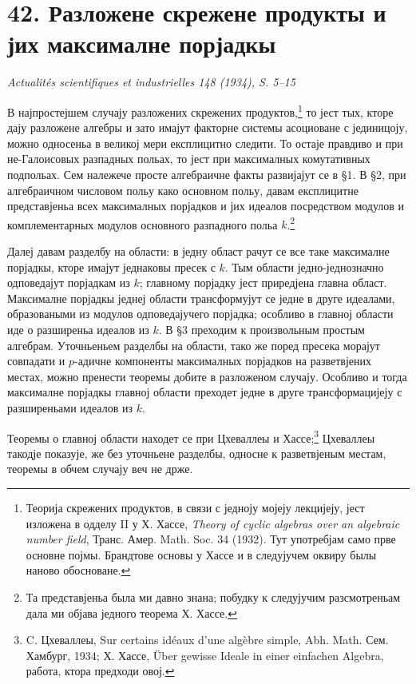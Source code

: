 ﻿\documentclass[11pt]{article}
\newcommand{\foreign}[1]{#1}
\begin{document}
\section*{42. Разложене скрежене продукты и јих максималне порјадкы}

\begin{center}
\emph{\foreign{Actualités scientifiques et industrielles 148 (1934), S. 5--15}}
\end{center}

В најпростејшем случају разложених скрежених продуктов,\footnote{Теорија скрежених продуктов, в связи с једноју мојеју лекцијеју, јест изложена в одделу II у Х. Хассе, \foreign{\emph{Theory of cyclic algebras over an algebraic number field}}, Транс. Амер. Math. Soc. 34 (1932). Тут употребјам само прве основне појмы. Брандтове основы у Хассе и в следујучем оквиру былы наново обосноване.} то јест тых, кторе дају разложене алгебры и зато имајут факторне системы асоциоване с јединицоју, можно односеньа в великој мери експлицитно следити. То остаје правдиво и при не-Галоисовых разпадных польах, то јест при максималных комутативных подпольах. Сем належече просте алгебраичне факты развијајут се в §1. В §2, при алгебраичном числовом польу како основном польу, давам експлицитне представјеньа всех максималных порјадков и јих идеалов посредством модулов и комплементарных модулов основного разпадного польа \(k\).\footnote{Та представјеньа была ми давно знана; побудку к следујучим разсмотреньам дала ми објава једного теорема Х. Хассе.}

Далеј давам разделбу на области: в једну област рачут се все таке максималне порјадкы, кторе имајут једнаковы пресек с \(k\). Тым области једно-једнозначно одповедајут порјадкам из \(k\); главному порјадку јест приредјена главна област. Максималне порјадкы једнеј области трансформујут се једне в друге идеалами, образоваными из модулов одповедајучего порјадка; особливо в главној области иде о разширеньа идеалов из \(k\). В §3 преходим к произвольным простым алгебрам. Уточньеньем разделбы на области, тако же поред пресека морајут совпадати и \(p\)-адичне компоненты максималных порјадков на разветвјених местах, можно пренести теоремы добите в разложеном случају. Особливо и тогда максималне порјадкы главној области преходет једне в друге трансформацијеју с разширеньами идеалов из \(k\).

Теоремы о главној области находет се при Цхеваллеы и Хассе;\footnote{C. Цхеваллеы, \foreign{Sur certains idéaux d'une algèbre simple}, Abh. Math. Сем. Хамбург, 1934; Х. Хассе, \foreign{Über gewisse Ideale in einer einfachen Algebra}, работа, ктора предходи овој.} Цхеваллеы такодје показује, же без уточньене разделбы, односне к разветвјеным местам, теоремы в обчем случају веч не држе.
\end{document}

